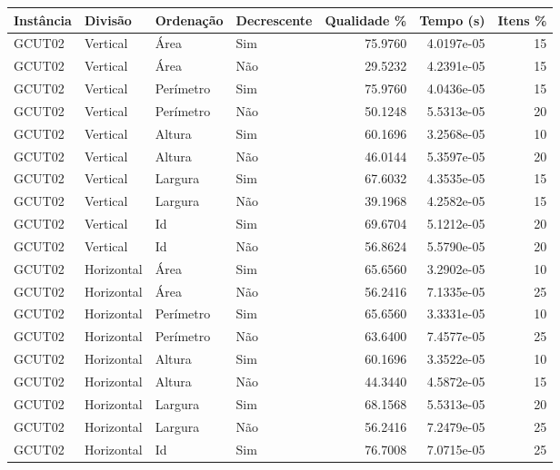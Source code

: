 \begin{tabular}{llllrrr}
\hline
Instância & Divisão     & Ordenação & Decrescente & Qualidade \% & Tempo (s)  & Itens \% \\
\hline
GCUT02    & Vertical    & Área      & Sim         & 75.9760      & 4.0197e-05 & 15       \\
GCUT02    & Vertical    & Área      & Não         & 29.5232      & 4.2391e-05 & 15       \\
GCUT02    & Vertical    & Perímetro & Sim         & 75.9760      & 4.0436e-05 & 15       \\
GCUT02    & Vertical    & Perímetro & Não         & 50.1248      & 5.5313e-05 & 20       \\
GCUT02    & Vertical    & Altura    & Sim         & 60.1696      & 3.2568e-05 & 10       \\
GCUT02    & Vertical    & Altura    & Não         & 46.0144      & 5.3597e-05 & 20       \\
GCUT02    & Vertical    & Largura   & Sim         & 67.6032      & 4.3535e-05 & 15       \\
GCUT02    & Vertical    & Largura   & Não         & 39.1968      & 4.2582e-05 & 15       \\
GCUT02    & Vertical    & Id        & Sim         & 69.6704      & 5.1212e-05 & 20       \\
GCUT02    & Vertical    & Id        & Não         & 56.8624      & 5.5790e-05 & 20       \\
GCUT02    & Horizontal  & Área      & Sim         & 65.6560      & 3.2902e-05 & 10       \\
GCUT02    & Horizontal  & Área      & Não         & 56.2416      & 7.1335e-05 & 25       \\
GCUT02    & Horizontal  & Perímetro & Sim         & 65.6560      & 3.3331e-05 & 10       \\
GCUT02    & Horizontal  & Perímetro & Não         & 63.6400      & 7.4577e-05 & 25       \\
GCUT02    & Horizontal  & Altura    & Sim         & 60.1696      & 3.3522e-05 & 10       \\
GCUT02    & Horizontal  & Altura    & Não         & 44.3440      & 4.5872e-05 & 15       \\
GCUT02    & Horizontal  & Largura   & Sim         & 68.1568      & 5.5313e-05 & 20       \\
GCUT02    & Horizontal  & Largura   & Não         & 56.2416      & 7.2479e-05 & 25       \\
GCUT02    & Horizontal  & Id        & Sim         & 76.7008      & 7.0715e-05 & 25       \\

\end{tabular}
